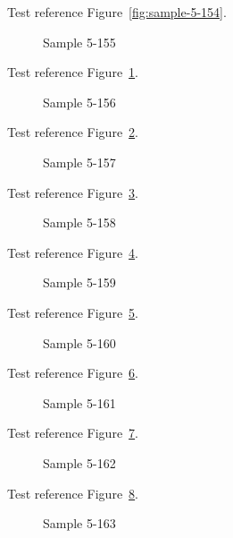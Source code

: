 Test reference Figure~\ref{fig:sample-5-154}.

\begin{figure}[tbhp]
\caption{Sample 5-155}
\label{fig:sample-5-155}
\end{figure}

Test reference Figure~\ref{fig:sample-5-155}.

\begin{figure}[tbhp]
\caption{Sample 5-156}
\label{fig:sample-5-156}
\end{figure}

Test reference Figure~\ref{fig:sample-5-156}.

\begin{figure}[tbhp]
\caption{Sample 5-157}
\label{fig:sample-5-157}
\end{figure}

Test reference Figure~\ref{fig:sample-5-157}.

\begin{figure}[tbhp]
\caption{Sample 5-158}
\label{fig:sample-5-158}
\end{figure}

Test reference Figure~\ref{fig:sample-5-158}.

\begin{figure}[tbhp]
\caption{Sample 5-159}
\label{fig:sample-5-159}
\end{figure}

Test reference Figure~\ref{fig:sample-5-159}.

\begin{figure}[tbhp]
\caption{Sample 5-160}
\label{fig:sample-5-160}
\end{figure}

Test reference Figure~\ref{fig:sample-5-160}.

\begin{figure}[tbhp]
\caption{Sample 5-161}
\label{fig:sample-5-161}
\end{figure}

Test reference Figure~\ref{fig:sample-5-161}.

\begin{figure}[tbhp]
\caption{Sample 5-162}
\label{fig:sample-5-162}
\end{figure}

Test reference Figure~\ref{fig:sample-5-162}.

\begin{figure}[tbhp]
\caption{Sample 5-163}
\label{fig:sample-5-163}
\end{figure}

